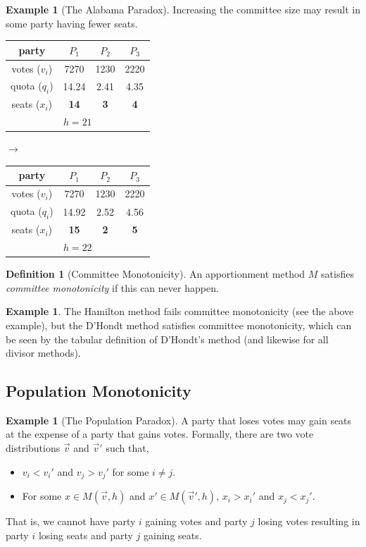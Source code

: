 \documentclass{book}
\theoremstyle{plain}
\theoremstyle{definition}
\newtheorem{definition}[theorem]{Definition}
\newtheorem{example}[theorem]{Example}
\theoremstyle{remark}
\begin{document}
\begin{example}[The Alabama Paradox]
    Increasing the committee size may result in some 
    party having fewer seats.

    \begin{center}
    \begin{tabular}{c c c c}
        \hline
        party & $P_1$ & $P_2$ & $P_3$ \\
        \hline
        votes ($v_i$) & 7270 & 1230 & 2220 \\
        quota ($q_i$) & 14.24 & 2.41 & 4.35 \\
        seats ($x_i$) & \textbf{14} & \textbf{3} & \textbf{4} \\
        \hline
        \multicolumn{4}{c}{$h = 21$}
    \end{tabular}
    \quad $\to$ \quad
    \begin{tabular}{c c c c}
        \hline
        party & $P_1$ & $P_2$ & $P_3$ \\
        \hline
        votes ($v_i$) & 7270 & 1230 & 2220 \\
        quota ($q_i$) & 14.92 & 2.52 & 4.56 \\
        seats ($x_i$) & \textbf{15} & \textbf{2} & \textbf{5} \\
        \hline
        \multicolumn{4}{c}{$h = 22$}
    \end{tabular}
    \end{center}
\end{example}

\begin{definition}[Committee Monotonicity]
    An apportionment method $M$ satisfies \emph{committee monotonicity}
    if this can never happen.
\end{definition}

\begin{example}
    The Hamilton method fails committee monotonicity (see the above example),
    but the D'Hondt method satisfies committee monotonicity,
    which can be seen by the tabular definition of 
    D'Hondt's method (and likewise for all divisor methods).
\end{example}

\subsection{Population Monotonicity}

\begin{example}[The Population Paradox]
    A party that loses votes may gain seats at the expense of a party that gains votes.
    Formally, 
    there are two vote distributions $\vec{v}$ and $\vec{v}'$ such that,
    \begin{itemize}
        \item $v_i < v_i'$ and $v_j > v_j'$ for some $i \neq j$.
        \item For some $x \in M(\vec{v}, h)$ and $x' \in M(\vec{v}', h)$,
        $x_i > x_i'$ and $x_j < x_j'$.
    \end{itemize}
    That is, we cannot have party $i$ gaining votes and 
    party $j$ losing votes resulting in party $i$ losing seats and party $j$ gaining seats.
\end{example}
\end{document}

